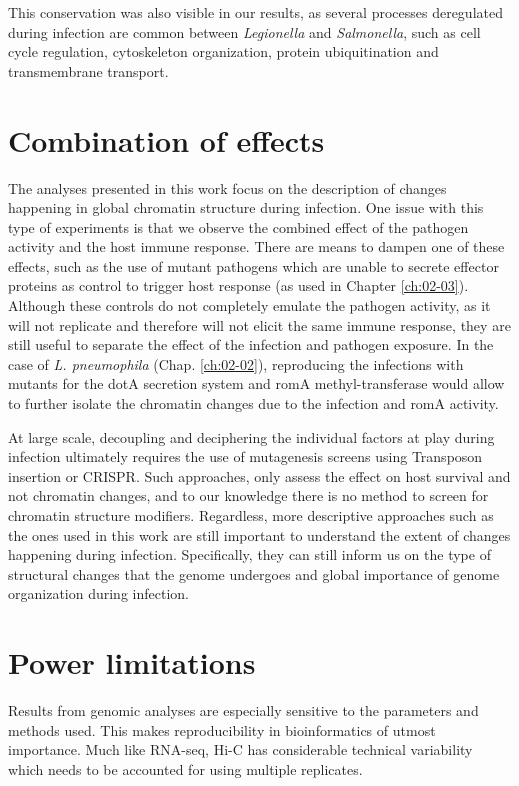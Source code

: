 This conservation was also visible in our results, as several processes deregulated during infection are common between \textit{Legionella} and \textit{Salmonella}, such as cell cycle regulation, cytoskeleton organization, protein ubiquitination and transmembrane transport.


\section{Combination of effects}

The analyses presented in this work focus on the description of changes happening in global chromatin structure during infection. One issue with this type of experiments is that we observe the combined effect of the pathogen activity and the host immune response. There are means to dampen one of these effects, such as the use of mutant pathogens which are unable to secrete effector proteins as control to trigger host response (as used in Chapter \ref{ch:02-03}). Although these controls do not completely emulate the pathogen activity, as it will not replicate  \cite{vogelConjugativeTransferVirulence1998} and therefore will not elicit the same immune response, they are still useful to separate the effect of the infection and pathogen exposure. In the case of \textit{L. pneumophila} (Chap. \ref{ch:02-02}), reproducing the infections with mutants for the dotA secretion system and romA methyl-transferase would allow to further isolate the chromatin changes due to the infection and romA activity.

At large scale, decoupling and deciphering the individual factors at play during infection ultimately requires the use of mutagenesis screens using Transposon insertion or CRISPR. Such approaches, only assess the effect on host survival and not chromatin changes, and to our knowledge there is no method to screen for chromatin structure modifiers. Regardless, more descriptive approaches such as the ones used in this work are still important to understand the extent of changes happening during infection. Specifically, they can still inform us on the type of structural changes that the genome undergoes and global importance of genome organization during infection.


\section{Power limitations}
Results from genomic analyses are especially sensitive to the parameters and methods used. This makes reproducibility in bioinformatics of utmost importance. Much like RNA-seq, Hi-C has considerable technical variability which needs to be accounted for using multiple replicates.

